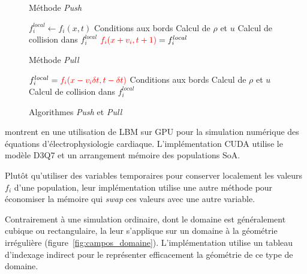 \begin{figure}[H]
	\centering
	\begin{adjustbox}{center}
		\noindent\begin{minipage}[t]{0.5\linewidth}
			\begin{algorithm}[H]\small
				\label{algo-push}
				\caption{Méthode \textit{Push}}
				\begin{algorithmic}
					\STATE $f^{local}_i \leftarrow f_i(x,t)$
					\ENDFOR
					\STATE Conditions aux bords
					\STATE Calcul de $\rho$ et $u$
					\STATE Calcul de collision dans $f^{local}_i$
					\STATE  ${\color{red}f_i(x+v_i, t +1)} = f^{local}_i$
					\ENDFOR
					\ENDFOR
				\end{algorithmic}
			\end{algorithm}
		\end{minipage}
		\begin{minipage}[t]{0.5\linewidth}
			\begin{algorithm}[H]\small
				\label{algo-pull}
				\caption{Méthode \textit{Pull}}
				\begin{algorithmic} 
					\FORALL{$x \in f_i(x,t)$ } 
					\FORALL{$i$ } 
					\STATE $f^{local}_i = {\color{red} f_i(x-v_i\delta t, t -\delta t)}$
					\ENDFOR
					\STATE Conditions aux bords
					\STATE Calcul de $\rho$ et $u$
					\FORALL{$i$ } 
					\STATE Calcul de collision dans $f^{local}_i$
					\ENDFOR
					\ENDFOR
				\end{algorithmic}
			\end{algorithm}
		\end{minipage}
	\end{adjustbox}
	\caption{Algorithmes \textit{Push} et \textit{Pull}}
	\label{fig:push-pull}
\end{figure} 

\citet{campos_lattice_2016} montrent en \citeyear{campos_lattice_2016} une utilisation de \acs{LBM} sur \acs{GPU} pour la simulation numérique des équations d'électrophysiologie cardiaque. L'implémentation CUDA utilise le modèle D3Q7 et un arrangement mémoire des populations \acs{SoA}.

Plutôt qu'utiliser des variables temporaires pour conserver localement les valeurs $f_i$ d'une population, leur implémentation utilise une autre méthode \cite{latt_technical_2007, mattila_efficient_2007} pour économiser la mémoire qui \textit{swap} ces valeurs avec une autre variable.

Contrairement à une simulation ordinaire, dont le domaine est généralement cubique ou rectangulaire, la leur s'applique sur un domaine à la géométrie irrégulière (figure~\ref{fig:campos_domaine}). L'implémentation utilise un tableau d'indexage indirect pour le représenter efficacement la géométrie de ce type de domaine.

